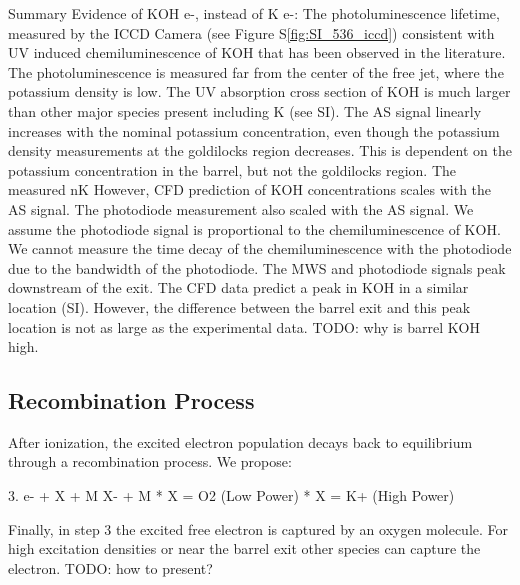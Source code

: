 \begin{outline}
\1 Summary Evidence of KOH \rightarrow e-, instead of K \rightarrow e-:
    \2 The photoluminescence lifetime, measured by the ICCD Camera (see Figure S\ref*{fig:SI_536_iccd}) consistent with UV induced chemiluminescence of KOH that has been observed in the literature. The photoluminescence is measured far from the center of the free jet, where the potassium density is low.
    \2 The UV absorption cross section of KOH is much larger than other major species present including K (see SI).
    \2 The AS signal linearly increases with the nominal potassium concentration, even though the potassium density measurements at the goldilocks region decreases. This   is dependent on the potassium concentration in the barrel, but not the goldilocks region. The measured nK However, CFD prediction of KOH concentrations scales with the AS signal. The photodiode measurement also scaled with the AS signal. We assume the photodiode signal is proportional to the chemiluminescence of KOH. We cannot measure the time decay of the chemiluminescence with the photodiode due to the bandwidth of the photodiode.
    \2 The MWS and photodiode signals peak downstream of the exit. The CFD data predict a peak in KOH in a similar location (SI). However, the difference between the barrel exit and this peak location is not as large as the experimental data. TODO: why is barrel KOH high. 
\end{outline}

\subsection{Recombination Process}


After ionization, the excited electron population decays back to equilibrium through a recombination process. We propose: 

3. e- + X + M \rightarrow X- + M
    * X = O2 (Low Power) 
    * X = K+ (High Power)

Finally, in step 3 the excited free electron is captured by an oxygen molecule. For high excitation densities or near the barrel exit other species can capture the electron. TODO: how to present? 

